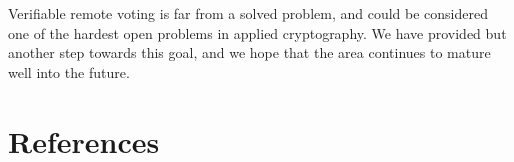 \documentclass[12pt,a4paper]{article}
\theoremstyle{definition}
\begin{document}
Verifiable remote voting is far from a solved problem, and could be considered one of the hardest open problems in applied cryptography. We have provided but another step towards this goal, and we hope that the area continues to mature well into the future.
\newpage
\section{References}


\newpage
\end{document}
